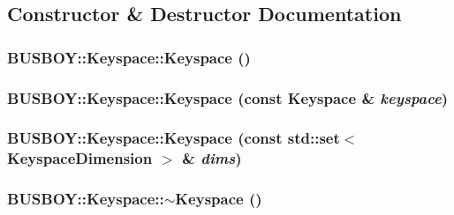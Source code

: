 \subsection{Constructor \& Destructor Documentation}
\hypertarget{classBUSBOY_1_1Keyspace_ab28c7c02951f2d00fe597436265db003}{
\subsubsection[{Keyspace}]{\setlength{\rightskip}{0pt plus 5cm}BUSBOY::Keyspace::Keyspace ()}}
\label{classBUSBOY_1_1Keyspace_ab28c7c02951f2d00fe597436265db003}
\hypertarget{classBUSBOY_1_1Keyspace_a4b7c17e4d39d0eb33874feded0d27717}{
\subsubsection[{Keyspace}]{\setlength{\rightskip}{0pt plus 5cm}BUSBOY::Keyspace::Keyspace (const {\bf Keyspace} \& {\em keyspace})}}
\label{classBUSBOY_1_1Keyspace_a4b7c17e4d39d0eb33874feded0d27717}
\hypertarget{classBUSBOY_1_1Keyspace_adcff93819cb8832b5937c304b198071b}{
\subsubsection[{Keyspace}]{\setlength{\rightskip}{0pt plus 5cm}BUSBOY::Keyspace::Keyspace (const std::set$<$ {\bf KeyspaceDimension} $>$ \& {\em dims})}}
\label{classBUSBOY_1_1Keyspace_adcff93819cb8832b5937c304b198071b}
\hypertarget{classBUSBOY_1_1Keyspace_a37daef1ada6348093cce7c0d59fc8b9a}{
\subsubsection[{$\sim$Keyspace}]{\setlength{\rightskip}{0pt plus 5cm}BUSBOY::Keyspace::$\sim$Keyspace ()}}
\label{classBUSBOY_1_1Keyspace_a37daef1ada6348093cce7c0d59fc8b9a}



